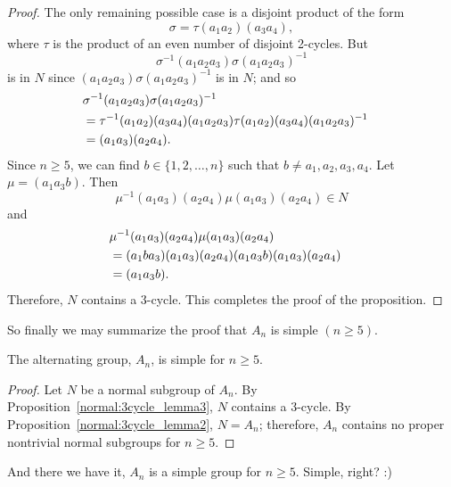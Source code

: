 {\begin{proof}
 
The only remaining possible case is a disjoint product of the form
\[
\sigma = \tau (a_1 a_2) (a_3 a_4),
\]
where $\tau$ is the product of an even number of disjoint 2-cycles.
But 
\[
\sigma^{-1}(a_1 a_2 a_3)\sigma(a_1 a_2 a_3)^{-1}
\]
is in $N$ since $(a_1 a_2 a_3)\sigma(a_1 a_2 a_3)^{-1}$ is in $N$; and
so 
\begin{align*}
\lefteqn{\sigma^{-1}(a_1 a_2 a_3)\sigma(a_1 a_2 a_3)^{-1} } \\
& = \tau^{-1} (a_1 a_2) (a_3 a_4) (a_1 a_2 a_3) 
      \tau (a_1 a_2)(a_3 a_4)(a_1 a_2 a_3)^{-1} \\
& = (a_1 a_3)(a_2 a_4).
\end{align*}
Since $n \geq 5$, we can find $b \in \{1, 2, \ldots, n \}$ such that
$b \neq a_1, a_2, a_3, a_4$. Let $\mu = (a_1 a_3 b)$. Then
\[
\mu^{-1} (a_1 a_3)(a_2 a_4) \mu (a_1 a_3)(a_2 a_4) \in N
\]
and
\begin{align*}
\lefteqn{\mu^{-1} (a_1 a_3)(a_2 a_4) \mu (a_1 a_3)(a_2 a_4) } \\
& = (a_1 b a_3)(a_1 a_3)(a_2 a_4) 
      (a_1 a_3 b)(a_1 a_3)(a_2 a_4) \\
& = (a_1 a_3 b ).
\end{align*}
Therefore, $N$ contains a 3-cycle. This completes the proof of the
proposition.  
\end{proof}
 
So finally we may summarize the proof that $A_n$ is simple $(n \geq 5)$.

\begin{thm}\label{normal:An_simple}
The alternating group, $A_n$, is simple for $n \geq 5$. 
\end{thm}
 
\begin{proof}
Let $N$ be a normal subgroup of $A_n$. By Proposition~\ref{normal:3cycle_lemma3}, $N$ contains a
3-cycle. By Proposition~\ref{normal:3cycle_lemma2}, $N = A_n$; therefore, $A_n$ contains no proper
nontrivial normal subgroups for $n \geq 5$.
\end{proof} 
 
And there we have it, $A_n$ is a simple group for $n \geq 5$.  Simple, right? :)
 
\histhead
 
 
}

